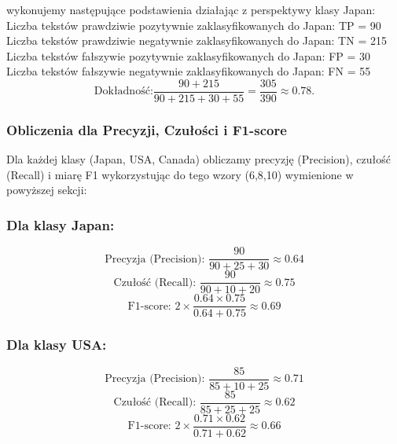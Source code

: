 \documentclass{article}
\begin{document}
\noindent wykonujemy następujące podstawienia działając z perspektywy klasy Japan: \\

\noindent Liczba tekstów prawdziwie pozytywnie zaklasyfikowanych do Japan: TP = 90 \\
Liczba tekstów prawdziwie negatywnie zaklasyfikowanych do Japan: TN = 215 \\
Liczba tekstów fałszywie pozytywnie zaklasyfikowanych do Japan: FP = 30 \\
Liczba tekstów fałszywie negatywnie zaklasyfikowanych do Japan: FN = 55 \\


\begin{equation}
    \text{Dokładność:} \frac{90 + 215}{90 + 215 + 30 + 55} = \frac{305}{390} \approx 0.78.
\end{equation}

\subsubsection*{Obliczenia dla Precyzji, Czułości i F1-score}

Dla każdej klasy (Japan, USA, Canada) obliczamy precyzję (Precision), czułość (Recall) i miarę F1 wykorzystując do tego wzory (6,8,10) wymienione w powyższej sekcji: \\

\subsubsection*{Dla klasy Japan:}

\begin{equation}
    \text{Precyzja (Precision): } \frac{90}{90 + 25 + 30} \approx 0.64
\end{equation}
\begin{equation}
    \text{Czułość (Recall): } \frac{90}{90 + 10 + 20} \approx 0.75
\end{equation}
\begin{equation}
    \text{F1-score: } 2 \times \frac{0.64 \times 0.75}{0.64 + 0.75} \approx 0.69
\end{equation}

\subsubsection*{Dla klasy USA:}

\begin{equation}
    \text{Precyzja (Precision): } \frac{85}{85 + 10 + 25} \approx 0.71
\end{equation}
\begin{equation}
    \text{Czułość (Recall): } \frac{85}{85 + 25 + 25} \approx 0.62
\end{equation}
\begin{equation}
    \text{F1-score: } 2 \times \frac{0.71 \times 0.62}{0.71 + 0.62} \approx 0.66
\end{equation}
\end{document}
